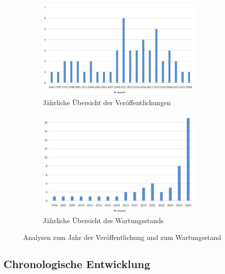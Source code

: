\begin{figure}[!htbp]
    \centering
    \begin{subfigure}[b]{0.48\textwidth}
        \centering
        \includegraphics[width=0.90\textwidth]{graphics_sim/1-anzahl-jahr.png}
        \caption{Jährliche Übersicht der Veröffentlichungen}
        \label{fig:1-anzahl-jahr}
    \end{subfigure}
    \hfill
    \begin{subfigure}[b]{0.48\textwidth}
        \centering
        \includegraphics[width=0.90\textwidth]{graphics_sim/2-veroeffentlichung.png}
        \caption{Jährliche Übersicht des Wartungsstands}
        \label{fig:2-veroeffentlichungen}
    \end{subfigure}
    \caption{Analysen zum Jahr der Veröffentlichung und zum Wartungsstand}
    \label{fig:veroeffentlichung_wartungsstand}
\end{figure}

\subsection{Chronologische Entwicklung}

